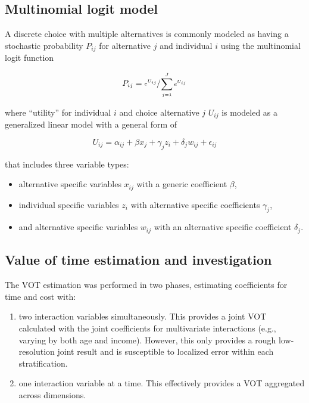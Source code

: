 \documentclass[numbered]{trbunofficial}\usepackage[]{graphicx}\usepackage[]{color}
\begin{document}
\subsection{Multinomial logit model}
A discrete choice with multiple alternatives is commonly modeled as having a stochastic probability $P_{ij}$ for alternative $j$ and individual $i$ using the multinomial logit function 

\begin{equation}
    P_{ij} = \sfrac{e^{U_{ij}}}{\sum\limits_{j=1}^J e^{U_{ij}}}
\end{equation}

\noindent where ``utility'' for individual $i$ and choice alternative $j$ $U_{ij}$ is modeled as a generalized linear model with a general form of

\begin{equation}
U_{ij} = \alpha_{ij} + \beta x_{j} + \gamma_{j} z_{i} + \delta_{j} w_{ij} + \epsilon_{ij}
\label{eq:fullmnl}
\end{equation}

\noindent that includes three variable types:
\begin{itemize}
    \item alternative specific variables $x_{ij}$ with a generic coefficient $\beta$,
    \item individual specific variables $z_i$ with alternative specific coefficients $\gamma_j$, 
    \item and alternative specific variables $w_{ij}$ with an alternative specific coefficient $\delta_j$.
\end{itemize}

\subsection{Value of time estimation and investigation}

The VOT estimation was performed in two phases, estimating coefficients for time and cost with:

\begin{enumerate}[leftmargin=0.25in, topsep=3pt, itemsep=3pt, parsep=3pt]
  \item two interaction variables simultaneously. This provides a joint VOT calculated with the joint coefficients for multivariate interactions (e.g., varying by both age and income). However, this only provides a rough low-resolution joint result and is susceptible to localized error within each stratification.

  \item one interaction variable at a time. This effectively provides a VOT aggregated across dimensions. %
\end{enumerate}
\end{document}
